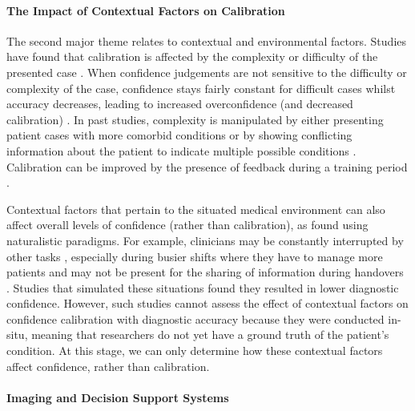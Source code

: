 \documentclass[a4paper, nobind]{templates/ociamthesis}
\begin{document}
\paragraph{The Impact of Contextual Factors on Calibration}\label{the-impact-of-contextual-factors-on-calibration}

The second major theme relates to contextual and environmental factors. Studies have found that calibration is affected by the complexity or difficulty of the presented case \autocite{meyer_physicians_2013,hausmann_sensitivity_2019,li_relationship_2023}. When confidence judgements are not sensitive to the difficulty or complexity of the case, confidence stays fairly constant for difficult cases whilst accuracy decreases, leading to increased overconfidence (and decreased calibration) \autocite{meyer_physicians_2013}. In past studies, complexity is manipulated by either presenting patient cases with more comorbid conditions \autocite{hausmann_sensitivity_2019} or by showing conflicting information about the patient to indicate multiple possible conditions \autocite{yang_nurses_2010}. Calibration can be improved by the presence of feedback during a training period \autocite{kuhn_improving_2022,staal_impact_2024}.

Contextual factors that pertain to the situated medical environment can also affect overall levels of confidence (rather than calibration), as found using naturalistic paradigms. For example, clinicians may be constantly interrupted by other tasks \autocite{soares_accuracy_2019}, especially during busier shifts where they have to manage more patients \autocite{gupta_associations_2023} and may not be present for the sharing of information during handovers \autocite{bergl_factors_2024}. Studies that simulated these situations found they resulted in lower diagnostic confidence. However, such studies cannot assess the effect of contextual factors on confidence calibration with diagnostic accuracy because they were conducted in-situ, meaning that researchers do not yet have a ground truth of the patient's condition. At this stage, we can only determine how these contextual factors affect confidence, rather than calibration.

\paragraph{Imaging and Decision Support Systems}\label{imaging-and-decision-support-systems}
\end{document}
